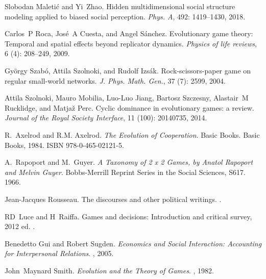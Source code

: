 Slobodan Maleti{\'c} and Yi~Zhao.
\newblock Hidden multidimensional social structure modeling applied to biased
social perception.
\newblock \emph{Phys. A}, 492: 1419--1430, 2018.

Carlos~P Roca, Jos{\'e}~A Cuesta, and Angel S{\'a}nchez.
\newblock Evolutionary game theory: Temporal and spatial effects beyond
replicator dynamics.
\newblock \emph{Physics of life reviews}, 6 (4): 208--249,
2009.

Gy{\"o}rgy Szab{\'o}, Attila Szolnoki, and Rudolf Izs{\'a}k.
\newblock Rock-scissors-paper game on regular small-world networks.
\newblock \emph{J. Phys. Math. Gen.}, 37 (7): 2599, 2004.

Attila Szolnoki, Mauro Mobilia, Luo-Luo Jiang, Bartosz Szczesny, Alastair~M
Rucklidge, and Matja{\v{z}} Perc.
\newblock Cyclic dominance in evolutionary games: a review.
\newblock \emph{Journal of the Royal Society Interface}, 11
(100): 20140735, 2014.

R.~Axelrod and R.M. Axelrod.
\newblock \emph{The Evolution of Cooperation}.
\newblock Basic Books. {Basic Books}, 1984.
\newblock ISBN 978-0-465-02121-5.

A.~Rapoport and M.~Guyer.
\newblock \emph{A Taxonomy of 2 x 2 Games, by Anatol Rapoport and Melvin
    Guyer}.
\newblock Bobbs-Merrill Reprint Series in the Social Sciences, {{S617}}. 1966.

Jean-Jacques Rousseau.
\newblock The discourses and other political writings.
.

RD~Luce and H~Raiffa.
\newblock Games and decisions: {{Introduction}} and critical survey, 2012 ed.
.

Benedetto Gui and Robert Sugden.
\newblock \emph{Economics and Social Interaction: {{Accounting}} for
    Interpersonal Relations}.
, 2005.

John~Maynard Smith.
\newblock \emph{Evolution and the Theory of Games}.
, 1982.

